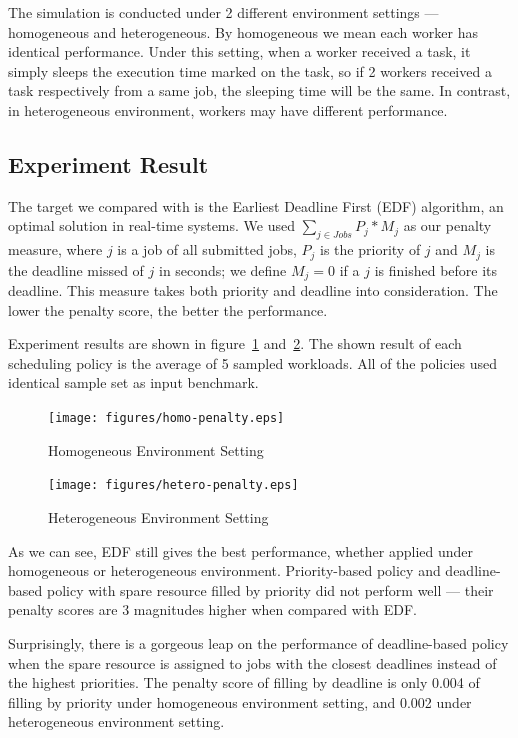 The simulation is conducted under 2 different environment settings ---
homogeneous and heterogeneous.
By homogeneous we mean each worker has identical performance.
Under this setting, when a worker received a task, it simply sleeps the
execution time marked on the task, so if 2 workers received a task
respectively from a same job, the sleeping time will be the same.
In contrast, in heterogeneous environment, workers may have different
performance.

\subsection{Experiment Result}

The target we compared with is the Earliest Deadline First (EDF)
algorithm, an optimal solution in real-time systems.
We used $\sum_{j \in Jobs} P_j * M_j$ as our penalty measure, where $j$
is a job of all submitted jobs, $P_j$ is the priority of $j$ and $M_j$
is the deadline missed of $j$ in seconds; we define $M_j = 0$ if a $j$
is finished before its deadline.
This measure takes both priority and deadline into consideration.
The lower the penalty score, the better the performance.

Experiment results are shown in figure~\ref{fig:homo-exp}
and~\ref{fig:hetero-exp}.
The shown result of each scheduling policy is the average of 5 sampled
workloads.
All of the policies used identical sample set as input benchmark.

\begin{figure}[htbp]
  \centering
  \texttt{[image: figures/homo-penalty.eps]}
  \caption{Homogeneous Environment Setting}
  \label{fig:homo-exp}
\end{figure}

\begin{figure}[htbp]
  \centering
  \texttt{[image: figures/hetero-penalty.eps]}
  \caption{Heterogeneous Environment Setting}
  \label{fig:hetero-exp}
\end{figure}

As we can see, EDF still gives the best performance, whether applied
under homogeneous or heterogeneous environment.
Priority-based policy and deadline-based policy with spare resource
filled by priority did not perform well --- their penalty scores are 3
magnitudes higher when compared with EDF.

Surprisingly, there is a gorgeous leap on the performance of
deadline-based policy when the spare resource is assigned to jobs with
the closest deadlines instead of the highest priorities.
The penalty score of filling by deadline is only 0.004 of filling by
priority under homogeneous environment setting, and 0.002 under
heterogeneous environment setting.

